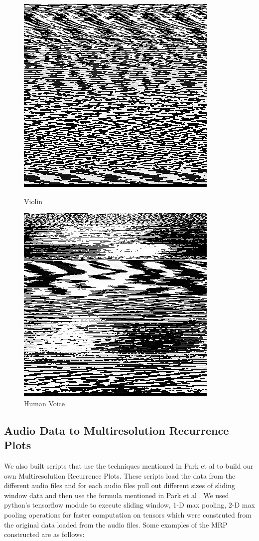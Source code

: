 \documentclass[letterpaper, 12 pt, conference]{ieeeconf}  %
\begin{document}
\begin{figure}[!htb]
   \begin{minipage}{0.24\textwidth}
     \centering
     \includegraphics[width=.7\linewidth]{../figs/stacking/vio.jpg}
     \caption{Violin}\label{fig:Vio_Stack}
   \end{minipage}\hfill
   \begin{minipage}{0.24\textwidth}
     \centering
     \includegraphics[width=.7\linewidth]{../figs/stacking/voi.jpg}
     \caption{Human Voice}\label{fig:Voi_Stack}
   \end{minipage}
\end{figure}

\subsection{Audio Data to Multiresolution Recurrence Plots}
We also built scripts that use the techniques mentioned in Park et al \cite{cnn_music_mrp} to build our own Multiresolution Recurrence Plots. These scripts load the data from the different audio files and for each audio files pull out different sizes of sliding window data and then use the formula mentioned in Park et al \cite{cnn_music_mrp}. We used python's tensorflow module to execute sliding window, 1-D max pooling, 2-D max pooling operations for faster computation on tensors which were construted from the original data loaded from the audio files. Some examples of the MRP constructed are as follows:
\end{document}
